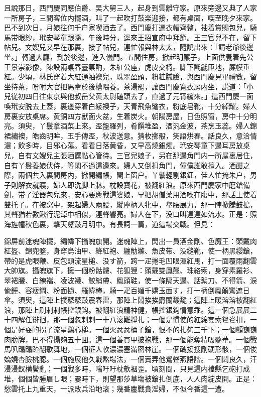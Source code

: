 且說那日，西門慶同應伯爵、吴大舅三人，起身到雲離守家。原來旁邊又典了人家一所房子，三間客位内擺酒，叫了一起吹打鼓楽迎接，都有桌面，喫至晚夕來家。巴不到次日，月娘往何千户家喫酒去了。西門慶打選衣帽齊整，袖着賞賜包兒，騎馬带眼紗，玳安琴童跟隨，午後時分，逕來王招宣府中拜節。王三官兒不在，留下帖兒。文嫂兒又早在那裏，接了帖兒，連忙報與林太太，隨說出來：「請老爺後邊坐。」轉過大廳，到於後邊，進入儀門。五間住房，掀起明簾子，上面供養着先公王景崇影像，陳設兩桌春臺菓酌，朱紅公座，虎皮交椅。脚下氍毹匝地，簾幙垂紅。少頃，林氏穿着大紅通袖襖兒，珠翠盈頭，粉粧膩臉，與西門慶見畢禮數，留坐待茶，吩咐大官把馬牽於後槽喂養。茶湯罷，讓西門慶寬衣房内坐，説道：「小兒従初四日往東京與他叔岳父黄太尉磕頭去了，直過了元宵纔來。」這西門慶一面喚玳安脱去上蓋，裏邊穿着白綾襖子，天青飛魚氅衣，粉底皂靴，十分綽耀。婦人房裏安放桌席。黄銅四方獸面火盆，生着炭火。朝陽房屋，日色照窗，房中十分明亮。須臾，丫鬟拿酒菜上來。盃盤羅列，肴饌堆盈，酒汎金波，茶烹玉蕊。婦人錦裙繡襖，皓齒明眸，玉手傳盃，秋波送意。猜枚擲骰，笑語烘春。話良久，意洽情濃；飲多時，目邪心蕩。看看日落黄昏，又早高燒銀燭。玳安琴童下邊耳房放桌兒，自有文嫂兒主張酒饌點心管待。三官兒娘子，另在那邊角門内一所屋裏居住，自有丫鬟養娘伏侍，等閑不過這邊來。婦人又倒扣角門，僮僕誰敢擅入。酒酣之際，兩個共入裏間房内，掀開繡帳，関上窗户。丫鬟輕剔銀釭，佳人忙掩朱户，男子則解衣就寢，婦人即洗脚上牀。枕設寳花，被翻紅浪。原來西門慶家中磨鎗備劍，带了淫器包兒來，安心要鏖戰這婆娘，早把胡僧薬用酒喫在腹中，那話上使着雙托子。在被窝中，架起婦人兩股，縱麈柄入牝中，擧腰展力，那一陣掀騰鼓搗，其聲猶若數鰍行泥淖中相似，連聲響亮。婦人在下，没口叫達達如流水。正是：照海旌幢秋色裏，擊天鼙鼓月明中。有長詞一篇，道這場交戰。但見：

\begin{myquote}
錦屏前迷魂陣擺，繡幃下攝魄旗開。迷魂陣上，閃出一員酒金剛、色魔王：頭戴肉紅盔、錦兜鍪，身穿烏油甲、絳紅袍、纏觔縧、魚皮带、没縫靴，使一柄黑纓鎗，帶的是虎眼鞭、皮包頭流星槌、没す箭，跨一疋捲毛凹眼渾紅馬，打一面覆雨翻雲大帥旗。攝魄旗下，擁一個粉骷髏、花狐狸：頭戴雙鳳翹、珠絡索，身穿素羅衫、翠裙腰、白練襠、凌波襪、鮫綃帶、鳳頭鞋，使一條隔天邊、話絮刀、不得箭、淚偸錘、容瘦鐧、粉面撾、羅幃棒，騎一疋百媚千嬌玉面す，打一柄倒鳳顛鸞遮日傘。須臾，這陣上撲鼕鼕鼓震春雷，那陣上鬧挨挨麝蘭靉靆；這陣上暖溶溶被翻紅浪，那陣上刷剌剌帳控銀鈎。被翻紅浪精神健，帳控銀鈎情意乖。這一個急展展二十四解任徘徊，那一個忽剌剌一十八滚難掙扎；一個是慣使的紅綿套索鴛鴦扣，一個是好耍的拐子流星鷄心槌。一個火忿忿桶子鎗，恨不的扎夠三千下；一個顫巍巍肉膀牌，巴不得搨夠五十囬。這一個善貫甲披袍戰，那一個能奪精吸髓華。一個戰馬叭蹋蹋蹅翻歌舞地，一個征人軟濃濃塞滿密林崖。一個醜搊搜剛硬形骸，一個俊嬌嬈杏臉桃腮。一個施展他久戰熬場法，一個賣弄他鶯聲燕語諧。一個鬦良久，汗浸浸釵横鬢亂；一個戰多時，喘吁吁枕欹裀歪。頃刻間，只見這内襠縣乞砲打成堆，個個皆腫眉し眼；霎時下，則望那莎草塲被鎗扎倒底，人人肉綻皮開。正是：愁雲托上九重天，一派敗兵沿地滚；幾番鏖戰貪淫婦，不似今番這一遭。
\end{myquote}

